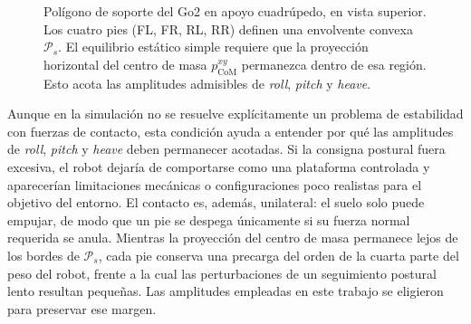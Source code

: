 \documentclass[12pt,a4paper]{report}
\begin{document}
\begin{figure}[H]
\centering
{}
\caption{Polígono de soporte del Go2 en apoyo cuadrúpedo, en vista superior. Los
cuatro pies (FL, FR, RL, RR) definen una envolvente convexa \(\mathcal{P}_s\). El
equilibrio estático simple requiere que la proyección horizontal del centro de
masa \(p_{\text{CoM}}^{xy}\) permanezca dentro de esa región. Esto acota las
amplitudes admisibles de \emph{roll}, \emph{pitch} y \emph{heave}.}
\label{fig:support_polygon}
\end{figure}

Aunque en la simulación no se resuelve explícitamente un problema de estabilidad
con fuerzas de contacto, esta condición ayuda a entender por qué las amplitudes
de \emph{roll}, \emph{pitch} y \emph{heave} deben permanecer acotadas. Si la
consigna postural fuera excesiva, el robot dejaría de comportarse como una
plataforma controlada y aparecerían limitaciones mecánicas o configuraciones poco
realistas para el objetivo del entorno. El contacto es, además, unilateral: el
suelo solo puede empujar, de modo que un pie se despega únicamente si su fuerza
normal requerida se anula. Mientras la proyección del centro de masa permanece
lejos de los bordes de \(\mathcal{P}_s\), cada pie conserva una precarga del
orden de la cuarta parte del peso del robot, frente a la cual las perturbaciones
de un seguimiento postural lento resultan pequeñas. Las amplitudes empleadas en
este trabajo se eligieron para preservar ese margen.
\end{document}
